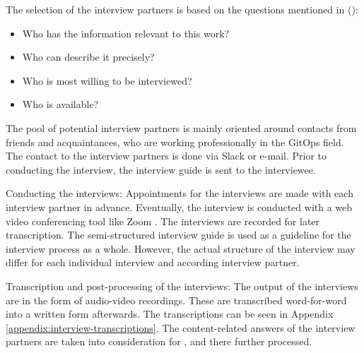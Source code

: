 The selection of the interview partners is based on the questions mentioned in
\citeauthor{glaser2010experteninterviews} (\citeyear{glaser2010experteninterviews}):

\begin{itemize}
	\item Who has the information relevant to this work?
	\item Who can describe it precisely?
	\item Who is most willing to be interviewed?
	\item Who is available?
\end{itemize}

The pool of potential interview partners is mainly oriented around
contacts from friends and acquaintances,
who are working professionally in the GitOps field.
The contact to the interview partners is done via Slack \autocite{slackWebsite} or e-mail.
Prior to conducting the interview, the interview guide is sent to the interviewee.

Conducting the interviews:
Appointments for the interviews are made with each interview partner in advance. 
Eventually, the interview is conducted with a web video conferencing tool like Zoom \autocite{zoomWebsite}.
The interviews are recorded for later transcription.
The semi-structured interview guide
is used as a guideline for the interview process as a whole.
However, the actual structure of the interview may differ for each individual interview and according interview partner.

Transcription and post-processing of the interviews:
The output of the interviews are in the form of audio-video recordings.
These are transcribed word-for-word into a written form afterwards.
The transcriptions can be seen in Appendix \ref{appendix:interview-transcriptions}.
The content-related answers of the interview partners are taken into consideration
for , and there further processed.




